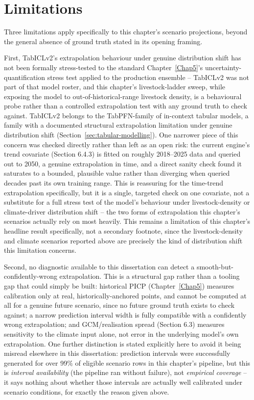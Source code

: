 \FloatBarrier

\section{Limitations}

Three limitations apply specifically to this chapter's scenario projections, beyond the general
absence of ground truth stated in its opening framing.

First, TabICLv2's extrapolation behaviour under genuine distribution shift has not been formally
stress-tested to the standard Chapter~\ref{Chap5}'s uncertainty-quantification stress test applied
to the production ensemble -- TabICLv2 was not part of that model roster, and this chapter's
livestock-ladder sweep, while exposing the model to out-of-historical-range livestock density, is a
behavioural probe rather than a controlled extrapolation test with any ground truth to check
against. TabICLv2 belongs to the TabPFN-family of in-context tabular models, a family with a
documented structural extrapolation limitation under genuine distribution shift
(Section~\ref{sec:tabular-modelling}). One narrower piece of this concern was checked directly rather
than left as an open risk: the current engine's trend covariate (Section 6.4.3) is fitted on roughly
2018--2025 data and queried out to 2050, a genuine extrapolation in time, and a direct sanity check
found it saturates to a bounded, plausible value rather than diverging when queried decades past its
own training range. This is reassuring for the time-trend extrapolation specifically, but it is a
single, targeted check on one covariate, not a substitute for a full stress test of the model's
behaviour under livestock-density or climate-driver distribution shift -- the two forms of
extrapolation this chapter's scenarios actually rely on most heavily. This remains a limitation of
this chapter's headline result specifically, not a secondary footnote, since the livestock-density
and climate scenarios reported above are precisely the kind of distribution shift this limitation
concerns.

Second, no diagnostic available to this dissertation can detect a smooth-but-confidently-wrong
extrapolation. This is a structural gap rather than a tooling gap that could simply be built:
historical PICP (Chapter~\ref{Chap5}) measures calibration only at real, historically-anchored
points, and cannot be computed at all for a genuine future scenario, since no future ground truth
exists to check against; a narrow prediction interval width is fully compatible with a confidently
wrong extrapolation; and GCM/realisation spread (Section 6.3) measures sensitivity to the climate
input alone, not error in the underlying model's own extrapolation. One further distinction is
stated explicitly here to avoid it being misread elsewhere in this dissertation: prediction
intervals were successfully generated for over 99\% of eligible scenario rows in this chapter's
pipeline, but this is \emph{interval availability} (the pipeline ran without failure), not
\emph{empirical coverage} -- it says nothing about whether those intervals are actually well
calibrated under scenario conditions, for exactly the reason given above.

